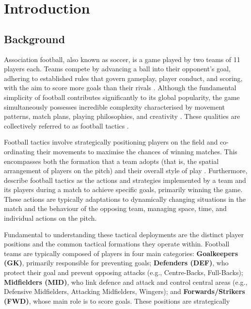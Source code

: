 
\chapter{Introduction}

\section{Background}

Association football, also known as soccer, is a game played by two teams of 11 players each. Teams compete by advancing a ball into their opponent's goal, adhering to established rules that govern gameplay, player conduct, and scoring, with the aim to score more goals than their rivals \citep{memmert_data_2018, sumpter_soccermatics_2016}. Although the fundamental simplicity of football contributes significantly to its global popularity, the game simultaneously possesses incredible complexity characterised by movement patterns, match plans, playing philosophies, and creativity \citep{bornn_soccer_2018, vicente_why_2024}. These qualities are collectively referred to as football tactics \citep{memmert_data_2018}.

Football tactics involve strategically positioning players on the field and co-ordinating their movements to maximise the chances of winning matches. This encompasses both the formation that a team adopts (that is, the spatial arrangement of players on the pitch) and their overall style of play \citep{wilson_inverting_2010}. Furthermore, \citet{rein_big_2016} describe football tactics as the actions and strategies implemented by a team and its players during a match to achieve specific goals, primarily winning the game. These actions are typically adaptations to dynamically changing situations in the match and the behaviour of the opposing team, managing space, time, and individual actions on the pitch.

Fundamental to understanding these tactical deployments are the distinct player positions and the common tactical formations they operate within.  Football teams are typically composed of players in four main categories: \textbf{Goalkeepers (GK)}, primarily responsible for preventing goals; \textbf{Defenders (DEF)}, who protect their goal and prevent opposing attacks (e.g., Centre-Backs, Full-Backs); \textbf{Midfielders (MID)}, who link defence and attack and control central areas (e.g., Defensive Midfielders, Attacking Midfielders, Wingers); and \textbf{Forwards/Strikers (FWD)}, whose main role is to score goals. These positions are strategically 

